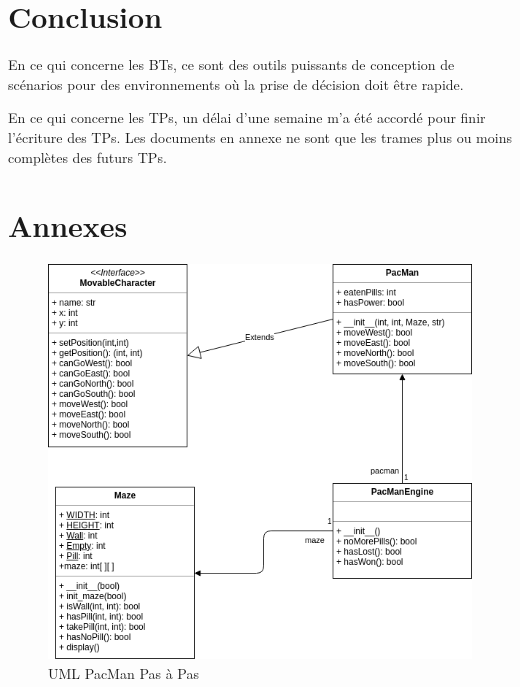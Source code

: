 \documentclass[11pt]{article}
\begin{document}
\section{Conclusion}
\label{sec-5}

En ce qui concerne les BTs, ce sont des outils puissants de conception de scénarios pour des environnements où la prise de décision doit être rapide.

En ce qui concerne les TPs, un délai d'une semaine m'a été accordé pour finir l'écriture des TPs. Les documents en annexe ne sont que les trames plus ou moins complètes des futurs TPs.



\section{Annexes}
\label{sec-6}

\begin{figure}[htb]
\centering
\includegraphics[width=.9\linewidth]{./img/Pacman_v0.png}
\caption{\label{pacman_v0}UML PacMan Pas à Pas}
\end{figure}
\end{document}
